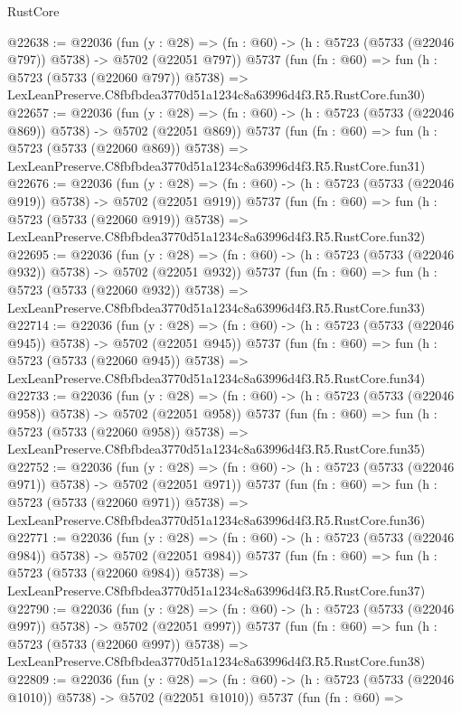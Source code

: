 \begin{lexlean}{RustCore}
\begin{coremodule}
@22638 := @22036
    (fun (y : @28) => (fn : @60) -> (h : @5723 (@5733 (@22046 @797)) @5738) -> @5702 (@22051 @797))
    @5737
    (fun (fn : @60) =>
    fun (h : @5723 (@5733 (@22060 @797)) @5738) =>
    LexLeanPreserve.C8fbfbdea3770d51a1234c8a63996d4f3.R5.RustCore.fun30)
@22657 := @22036
    (fun (y : @28) => (fn : @60) -> (h : @5723 (@5733 (@22046 @869)) @5738) -> @5702 (@22051 @869))
    @5737
    (fun (fn : @60) =>
    fun (h : @5723 (@5733 (@22060 @869)) @5738) =>
    LexLeanPreserve.C8fbfbdea3770d51a1234c8a63996d4f3.R5.RustCore.fun31)
@22676 := @22036
    (fun (y : @28) => (fn : @60) -> (h : @5723 (@5733 (@22046 @919)) @5738) -> @5702 (@22051 @919))
    @5737
    (fun (fn : @60) =>
    fun (h : @5723 (@5733 (@22060 @919)) @5738) =>
    LexLeanPreserve.C8fbfbdea3770d51a1234c8a63996d4f3.R5.RustCore.fun32)
@22695 := @22036
    (fun (y : @28) => (fn : @60) -> (h : @5723 (@5733 (@22046 @932)) @5738) -> @5702 (@22051 @932))
    @5737
    (fun (fn : @60) =>
    fun (h : @5723 (@5733 (@22060 @932)) @5738) =>
    LexLeanPreserve.C8fbfbdea3770d51a1234c8a63996d4f3.R5.RustCore.fun33)
@22714 := @22036
    (fun (y : @28) => (fn : @60) -> (h : @5723 (@5733 (@22046 @945)) @5738) -> @5702 (@22051 @945))
    @5737
    (fun (fn : @60) =>
    fun (h : @5723 (@5733 (@22060 @945)) @5738) =>
    LexLeanPreserve.C8fbfbdea3770d51a1234c8a63996d4f3.R5.RustCore.fun34)
@22733 := @22036
    (fun (y : @28) => (fn : @60) -> (h : @5723 (@5733 (@22046 @958)) @5738) -> @5702 (@22051 @958))
    @5737
    (fun (fn : @60) =>
    fun (h : @5723 (@5733 (@22060 @958)) @5738) =>
    LexLeanPreserve.C8fbfbdea3770d51a1234c8a63996d4f3.R5.RustCore.fun35)
@22752 := @22036
    (fun (y : @28) => (fn : @60) -> (h : @5723 (@5733 (@22046 @971)) @5738) -> @5702 (@22051 @971))
    @5737
    (fun (fn : @60) =>
    fun (h : @5723 (@5733 (@22060 @971)) @5738) =>
    LexLeanPreserve.C8fbfbdea3770d51a1234c8a63996d4f3.R5.RustCore.fun36)
@22771 := @22036
    (fun (y : @28) => (fn : @60) -> (h : @5723 (@5733 (@22046 @984)) @5738) -> @5702 (@22051 @984))
    @5737
    (fun (fn : @60) =>
    fun (h : @5723 (@5733 (@22060 @984)) @5738) =>
    LexLeanPreserve.C8fbfbdea3770d51a1234c8a63996d4f3.R5.RustCore.fun37)
@22790 := @22036
    (fun (y : @28) => (fn : @60) -> (h : @5723 (@5733 (@22046 @997)) @5738) -> @5702 (@22051 @997))
    @5737
    (fun (fn : @60) =>
    fun (h : @5723 (@5733 (@22060 @997)) @5738) =>
    LexLeanPreserve.C8fbfbdea3770d51a1234c8a63996d4f3.R5.RustCore.fun38)
@22809 := @22036
    (fun (y : @28) =>
    (fn : @60) -> (h : @5723 (@5733 (@22046 @1010)) @5738) -> @5702 (@22051 @1010))
    @5737
    (fun (fn : @60) =>

\end{coremodule}
\end{lexlean}

